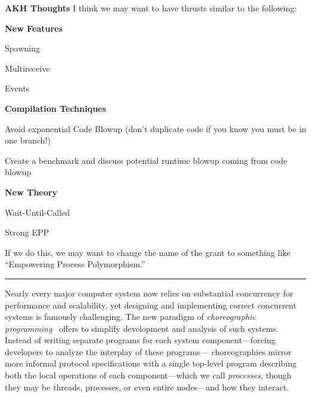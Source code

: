 \noindent\textbf{AKH Thoughts}
I think we may want to have thrusts similar to the following:
\begin{outline}[2]{}
\item \textbf{New Features}
  \begin{lvl}
  \item Spawning
  \item Multireceive 
  \item Events
  \end{lvl}
\item \textbf{Compilation Techniques}
  \begin{lvl}
  \item Avoid exponential Code Blowup (don't duplicate code if you know you must be in one branch!)
  \item Create a benchmark and discuss potential runtime blowup coming from code blowup
  \end{lvl}
\item \textbf{New Theory}
  \begin{lvl}
  \item Wait-Until-Called
  \item Strong EPP 
  \end{lvl}
\end{outline}

If we do this, we may want to change the name of the grant to something like ``Empowering Process Polymorphism.''

\vspace{0.5em}
\hrule
\vspace{0.5em}
\fi

Nearly every major computer system now relies on substantial concurrency for performance and scalability,
yet designing and implementing correct concurrent systems is famously challenging.
The new paradigm of \emph{choreographic programming}~\citep{Montesi13,Montesi23} offers to simplify development and analysis of such systems.
Instead of writing separate programs for each system component---forcing developers to analyze the interplay of these programs---%
choreographies mirror more informal protocol specifications with a single top-level program
describing both the local operations of each component---which we call \emph{processes}, though they may be threads, processes, or even entire nodes---and how they interact.

